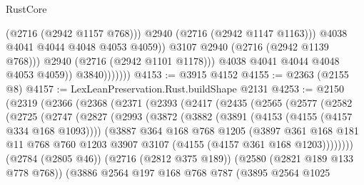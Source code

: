 \begin{lexlean}{RustCore}
\begin{coremodule}
                                  (@2716 (@2942 @1157 @768)))
                                @2940
                                (@2716 (@2942 @1147 @1163)))
                              @4038
                              @4041
                              @4044
                              @4048
                              @4053
                              @4059))
                          @3107
                          @2940
                          (@2716 (@2942 @1139 @768)))
                        @2940
                        (@2716 (@2942 @1101 @1178)))
                      @4038
                      @4041
                      @4044
                      @4048
                      @4053
                      @4059))
                  @3840)))))))
@4153 := @3915 @4152
@4155 := @2363 (@2155 @8)
@4157 := LexLeanPreservation.Rust.buildShape @2131
@4253 := @2150
    (@2319
      (@2366
        (@2368
          (@2371
            (@2393
              (@2417
                (@2435
                  (@2565
                    (@2577
                      (@2582
                        (@2725
                          (@2747
                            (@2827
                              (@2993
                                (@3872
                                  (@3882
                                    (@3891 (@4153 (@4155 (@4157 @334 @168 @1093))))
                                    (@3887
                                      @364
                                      @168
                                      @768
                                      @1205
                                      (@3897
                                        @361
                                        @168
                                        @181
                                        @11
                                        @768
                                        @760
                                        @1203
                                        @3907
                                        @3107
                                        (@4155 (@4157 @361 @168 @1203))))))))
                            (@2784 (@2805 @46))
                            (@2716 (@2812 @375 @189))
                            (@2580 (@2821 @189 @133 @778 @768))
                            (@3886
                              @2564
                              @197
                              @168
                              @768
                              @787
                              (@3895
                                @2564
                                @1025

\end{coremodule}
\end{lexlean}
